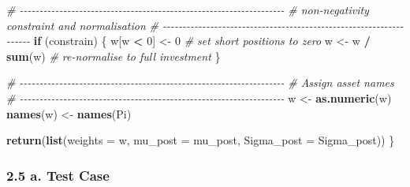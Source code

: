 \documentclass[
  12pt,
]{article}
\newenvironment{Shaded}{\begin{snugshade}}{\end{snugshade}}
\newcommand{\AttributeTok}[1]{\textcolor[rgb]{0.13,0.29,0.53}{#1}}
\newcommand{\CommentTok}[1]{\textcolor[rgb]{0.56,0.35,0.01}{\textit{#1}}}
\newcommand{\ControlFlowTok}[1]{\textcolor[rgb]{0.13,0.29,0.53}{\textbf{#1}}}
\newcommand{\DecValTok}[1]{\textcolor[rgb]{0.00,0.00,0.81}{#1}}
\newcommand{\FunctionTok}[1]{\textcolor[rgb]{0.13,0.29,0.53}{\textbf{#1}}}
\newcommand{\NormalTok}[1]{#1}
\newcommand{\OtherTok}[1]{\textcolor[rgb]{0.56,0.35,0.01}{#1}}
\newcommand{\SpecialCharTok}[1]{\textcolor[rgb]{0.81,0.36,0.00}{\textbf{#1}}}
\begin{document}
\begin{Shaded}
\begin{Highlighting}[]
  \CommentTok{\# {-}{-}{-}{-}{-}{-}{-}{-}{-}{-}{-}{-}{-}{-}{-}{-}{-}{-}{-}{-}{-}{-}{-}{-}{-}{-}{-}{-}{-}{-}{-}{-}{-}{-}{-}{-}{-}{-}{-}{-}{-}{-}{-}{-}{-}{-}{-}{-}{-}{-}{-}{-}{-}{-}{-}{-}{-}{-}{-}{-}{-}{-}{-}{-}{-}{-}{-}}
  \CommentTok{\# non{-}negativity constraint and normalisation}
  \CommentTok{\# {-}{-}{-}{-}{-}{-}{-}{-}{-}{-}{-}{-}{-}{-}{-}{-}{-}{-}{-}{-}{-}{-}{-}{-}{-}{-}{-}{-}{-}{-}{-}{-}{-}{-}{-}{-}{-}{-}{-}{-}{-}{-}{-}{-}{-}{-}{-}{-}{-}{-}{-}{-}{-}{-}{-}{-}{-}{-}{-}{-}{-}{-}{-}{-}{-}{-}{-}}
  \ControlFlowTok{if}\NormalTok{ (constrain) \{}
\NormalTok{    w[w }\SpecialCharTok{\textless{}} \DecValTok{0}\NormalTok{] }\OtherTok{\textless{}{-}} \DecValTok{0}   \CommentTok{\# set short positions to zero}
\NormalTok{    w }\OtherTok{\textless{}{-}}\NormalTok{ w }\SpecialCharTok{/} \FunctionTok{sum}\NormalTok{(w) }\CommentTok{\# re{-}normalise to full investment}
\NormalTok{  \}}

  \CommentTok{\# {-}{-}{-}{-}{-}{-}{-}{-}{-}{-}{-}{-}{-}{-}{-}{-}{-}{-}{-}{-}{-}{-}{-}{-}{-}{-}{-}{-}{-}{-}{-}{-}{-}{-}{-}{-}{-}{-}{-}{-}{-}{-}{-}{-}{-}{-}{-}{-}{-}{-}{-}{-}{-}{-}{-}{-}{-}{-}{-}{-}{-}{-}{-}{-}{-}{-}{-}}
  \CommentTok{\# Assign asset names }
  \CommentTok{\# {-}{-}{-}{-}{-}{-}{-}{-}{-}{-}{-}{-}{-}{-}{-}{-}{-}{-}{-}{-}{-}{-}{-}{-}{-}{-}{-}{-}{-}{-}{-}{-}{-}{-}{-}{-}{-}{-}{-}{-}{-}{-}{-}{-}{-}{-}{-}{-}{-}{-}{-}{-}{-}{-}{-}{-}{-}{-}{-}{-}{-}{-}{-}{-}{-}{-}{-}}
\NormalTok{  w }\OtherTok{\textless{}{-}} \FunctionTok{as.numeric}\NormalTok{(w)}
  \FunctionTok{names}\NormalTok{(w) }\OtherTok{\textless{}{-}} \FunctionTok{names}\NormalTok{(Pi)}

  \FunctionTok{return}\NormalTok{(}\FunctionTok{list}\NormalTok{(}\AttributeTok{weights =}\NormalTok{ w,}
              \AttributeTok{mu\_post =}\NormalTok{ mu\_post,}
              \AttributeTok{Sigma\_post =}\NormalTok{ Sigma\_post))}
\NormalTok{\}}
\end{Highlighting}
\end{Shaded}

\subsubsection{2.5 a. Test Case}\label{a.-test-case}
\end{document}

